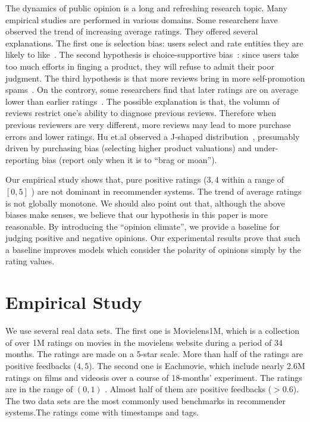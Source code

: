 \documentclass{sig-alternate}
\begin{document}
The dynamics of public opinion is a long and refreshing research topic. Many empirical studies are performed in various domains. Some researchers have observed the trend of increasing average ratings. They offered several explanations. The first one is selection bias: users select and rate entities they are likely to like~\cite{Dalvi2013Para}. The second hypothesis is choice-supportive bias~\cite{Cohen1970dissonance}: since users take too much efforts in finging a product, they will refuse to admit their poor judgment. The third hypothesis is that more reviews bring in more self-promotion spams~\cite{Jindal2008Opinion}. On the controry, some researchers find that later ratings are on average lower than earlier ratings~\cite{Godes2012Sequential}. The possible explanation is that, the volumn of reviews restrict one's ability to diagnose previous reviews. Therefore when previous reviewers are very different, more reviews may  lead to more purchase errors and lower ratings. Hu et.al observed a J-shaped distribution~\cite{Hu2009Overcoming}, presumably driven by purchasing bias (selecting higher product valuations) and under-reporting bias (report only when it is to ``brag or moan'').

Our empirical study shows that, pure positive ratings ($3,4$ within a range of $[0,5]$ ) are not dominant in recommender systems. The trend of average ratings is not globally monotone. We should also point out that, although the above biases make senses, we believe that our hypothesis in this paper is more reasonable. By introducing the ``opinion climate'', we provide a baseline for judging positive and negative opinions. Our experimental results prove that such a baseline  improves models which consider the polarity of opinions simply by the rating values.



\section{Empirical Study}\label{sec:empirical}
We use several real data sets. The first one is Movielens1M, which is a collection of over 1M ratings on movies in the movielens website during a period of 34 months. The ratings are made on a 5-star scale. More than half of the ratings are positive feedbacks ($4,5$).  The second one is Eachmovie, which include nearly 2.6M ratings on films and videosis over a course of 18-months' experiment. The  ratings are in the range of $(0,1)$ . Almost half of them are positive feedbacks ($>0.6$). The two data sets are the most commonly used benchmarks in recommender systems.The ratings come with timestamps and tags.
\end{document}
